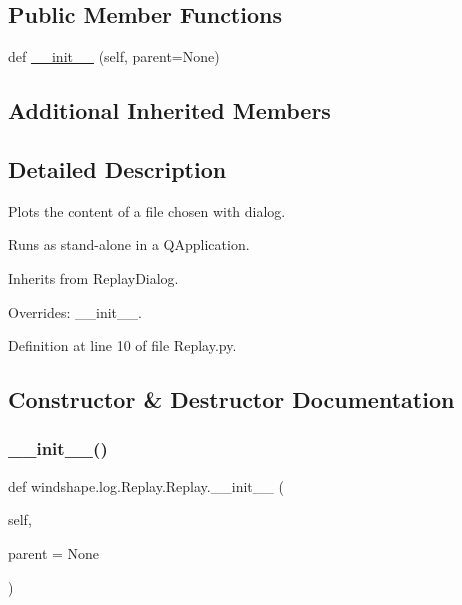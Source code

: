 \subsection*{Public Member Functions}
\begin{DoxyCompactItemize}
\item 
def \mbox{\hyperlink{classwindshape_1_1log_1_1_replay_1_1_replay_a2014be0a8931f487d98cfa264e51b45a}{\+\_\+\+\_\+init\+\_\+\+\_\+}} (self, parent=None)
\end{DoxyCompactItemize}
\subsection*{Additional Inherited Members}


\subsection{Detailed Description}
\begin{DoxyVerb}Plots the content of a file chosen with dialog.

Runs as stand-alone in a QApplication.

Inherits from ReplayDialog.

Overrides: __init__.
\end{DoxyVerb}
 

Definition at line 10 of file Replay.\+py.



\subsection{Constructor \& Destructor Documentation}
\mbox{\label{classwindshape_1_1log_1_1_replay_1_1_replay_a2014be0a8931f487d98cfa264e51b45a}} 
\subsubsection{\texorpdfstring{\+\_\+\+\_\+init\+\_\+\+\_\+()}{\_\_init\_\_()}}
{\footnotesize\ttfamily def windshape.\+log.\+Replay.\+Replay.\+\_\+\+\_\+init\+\_\+\+\_\+ (\begin{DoxyParamCaption}\item[{}]{self,  }\item[{}]{parent = {\ttfamily None} }\end{DoxyParamCaption})}


